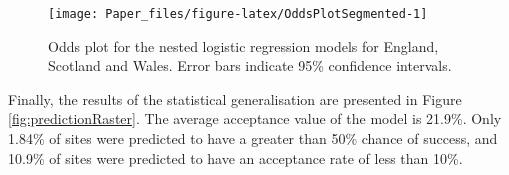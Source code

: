 \documentclass[a4paper,]{article}
\theoremstyle{definition}
\theoremstyle{definition}
\theoremstyle{definition}
\theoremstyle{remark}
\begin{document}
\begin{table}[!h]

\caption{\label{tab:kableNestedModelResults}Comparison of subset Logistic Regression Models based on the global parameters list}
\centering
{}
\end{table}





\begin{figure}[h]

{\centering \texttt{[image: Paper\_files/figure-latex/OddsPlotSegmented-1]} 

}

\caption{Odds plot for the nested logistic regression
models for England, Scotland and Wales. Error bars indicate 95\%
confidence intervals.}\label{fig:OddsPlotSegmented}
\end{figure}

Finally, the results of the statistical generalisation are presented in
Figure \ref{fig:predictionRaster}. The average acceptance value of the
model is 21.9\%. Only 1.84\% of sites were predicted to have a greater
than 50\% chance of success, and 10.9\% of sites were predicted to have
an acceptance rate of less than 10\%.
\end{document}

